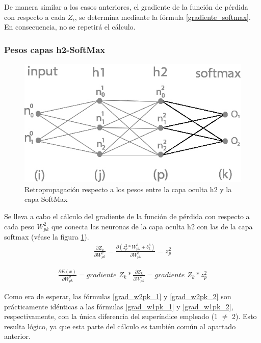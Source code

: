 De manera similar a los casos anteriores, el gradiente de la función de pérdida con respecto a cada $Z_i$, se determina mediante la fórmula \ref{gradiente_softmax}. En consecuencia, no se repetirá el cálculo. \\

\subsubsection{Pesos capas h2-SoftMax}

\begin{figure}[H]
	\centering
	\includegraphics[scale=0.35]{imagenes/nn_2_capa_pesos_h2_output.jpg}  
	\caption{Retropropagación respecto a los pesos entre la capa oculta h2 y la capa SoftMax}
	\label{fig:nn_2_capa_pesos_h2_output}
\end{figure}

Se lleva a cabo el cálculo del gradiente de la función de pérdida con respecto a cada peso $W^2_{pk}$ que conecta las neuronas de la capa oculta h2 con las de la capa softmax (véase la figura \ref{fig:nn_2_capa_pesos_h2_output}). \\

\begin{gather}
	\frac{\partial Z_k}{\partial W^2_{pk}} = \frac{\partial (z^2_p * W^2 _{pk} + b^3_k)}{\partial W^2_{pk }} = z^2_p 
	\label{grad_w2pk_1}
\end{gather}

\begin{gather}
	\frac{\partial E(x)}{\partial W^2_{pk }} =  gradiente\_Z_k * \frac{\partial Z_k}{\partial W^2_{pk }} = gradiente\_Z_k * z^2_p
	\label{grad_w2pk_2}
\end{gather}

Como era de esperar, las fórmulas \ref{grad_w2pk_1} y \ref{grad_w2pk_2} son prácticamente idénticas a las fórmulas \ref{grad_w1pk_1} y \ref{grad_w1pk_2}, respectivamente, con la única diferencia del superíndice empleado (1 $\neq$ 2). Esto resulta lógico, ya que esta parte del cálculo es también común al apartado anterior.

